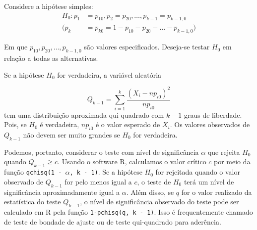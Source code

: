 \documentclass[12pt]{beamer}
\begin{document}
\begin{frame}{}
\begin{block}{}
\justifying
Considere a hipótese simples:
\begin{align*}
    H_0: p_1 &= p_{10}, p_2 = p_{20}, \ldots, p_{k-1} = p_{k-1,0}\\ 
    (p_k &= p_{k0} = 1 - p_{10} - p_{20} - \ldots - p_{k-1,0})
\end{align*}

Em que $p_{10}, p_{20}, \ldots, p_{k-1,0}$ são valores especificados. Deseja-se testar $H_0$ em relação a todas as alternativas.  
\end{block}
\pause
\begin{block}{}
\justifying
Se a hipótese $H_0$ for verdadeira, a variável aleatória

\[
Q_{k-1} = \sum_{i=1}^{k} \frac{(X_i - n p_{i0})^2}{n p_{i0}}
\]
tem uma distribuição aproximada qui-quadrado com $k - 1$ graus de liberdade. Pois, se $H_0$ é verdadeira, $n p_{i0}$ é o valor esperado de $X_i.$ Os valores observados de $Q_{k-1}$ não devem ser muito grandes se $H_0$ for verdadeira.
\end{block}
\end{frame}

\begin{frame}{}
\begin{block}{}
\justifying
Podemos, portanto, considerar o teste com nível de significância $\alpha$ que rejeita $H_0$ quando $Q_{k-1} \geq c.$ Usando o software R, calculamos o valor crítico $c$ por meio da função \texttt{qchisq(1 - $\alpha$, k - 1)}. Se a hipótese $H_0$ for rejeitada quando o valor observado de $Q_{k-1}$ for pelo menos igual a $c$, o teste de $H_0$ terá um nível de significância aproximadamente igual a $\alpha$. Além disso, se $q$ for o valor realizado da estatística do teste $Q_{k-1}$, o nível de significância observado do teste pode ser calculado em R pela função \texttt{1-pchisq(q, k - 1)}. Isso é frequentemente chamado de teste de bondade de ajuste ou de teste qui-quadrado para aderência.

\end{block}
\end{frame}
\end{document}
